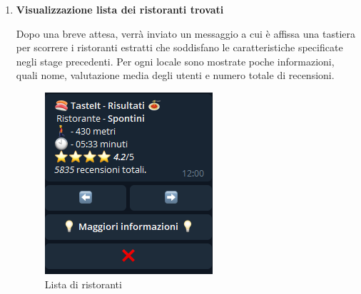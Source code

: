 \documentclass[a4paper, 12pt]{article}
\begin{document}
\begin{enumerate}
		\item \textbf{Visualizzazione lista dei ristoranti trovati}
		
		Dopo una breve attesa, verrà inviato un messaggio a cui è affissa una tastiera per scorrere i ristoranti estratti che soddisfano le caratteristiche specificate negli stage precedenti. Per ogni locale sono mostrate poche informazioni, quali nome, valutazione media degli utenti e numero totale di recensioni. 
			
		\newpage
		\begin{figure}[!htb]
			\begin{minipage}{0.35\textwidth}
				\centering
				\includegraphics[width=\linewidth]{cercaCommand_generalRestaurantInfoList.png}
				\caption{Lista di ristoranti}
			\end{minipage}\hfill
			\begin{minipage}{0.35\textwidth}
				\centering

\end{minipage}
\end{figure}
\end{enumerate}
\end{document}
